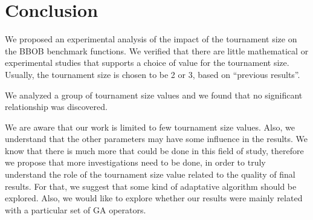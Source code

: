 \section{Conclusion}
\label{sec:conclusion}


We proposed an experimental analysis of the impact of the tournament size on the BBOB benchmark functions. We verified that there are little mathematical or experimental studies that supports a choice of value for the tournament size. Usually, the tournament size is chosen to be 2 or 3, based on ``previous results''.
 
 
We analyzed a group of tournament size values and we found that no significant relationship was discovered.

We are aware that our work is limited to few tournament size values. Also, we understand that the other parameters may have some influence in the results. We know that there is much more that could be done in this field of study, therefore we propose that more investigations need to be done, in order to truly understand the role of the tournament size value related to the quality of final results. For that, we suggest that some kind of adaptative algorithm should be explored. Also, we would like to explore whether our results were mainly related with a particular set of GA operators.